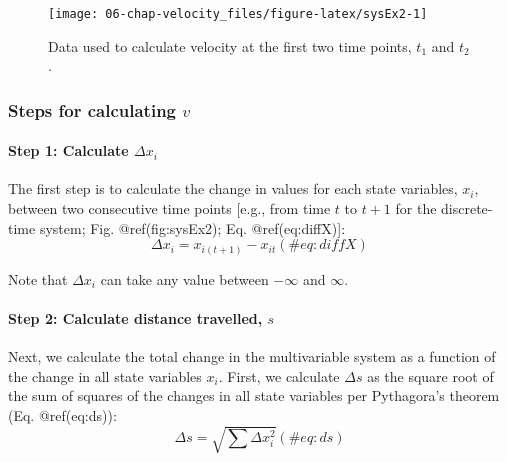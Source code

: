 \documentclass[]{article}
\let\oldparagraph\paragraph
\renewcommand{\paragraph}[1]{\oldparagraph{#1}\mbox{}}
\begin{document}
\begin{figure}

{\centering \texttt{[image: 06-chap-velocity\_files/figure-latex/sysEx2-1]} 

}

\caption{Data used to calculate velocity at the first two time points, $t_1$ and $t_2$.}\label{fig:sysEx2}
\end{figure}

\hypertarget{steps-for-calculating-v}{%
\subsubsection{\texorpdfstring{Steps for calculating
\(v\)}{Steps for calculating v}}\label{steps-for-calculating-v}}

\hypertarget{step-1-calculate-delta-x_i}{%
\paragraph{\texorpdfstring{Step 1: Calculate
\(\Delta x_i\)}{Step 1: Calculate \textbackslash{}Delta x\_i}}\label{step-1-calculate-delta-x_i}}

The first step is to calculate the change in values for each state
variables, \(x_i\), between two consecutive time points {[}e.g., from
time \(t\) to \(t+1\) for the discrete-time system; Fig.
@ref(fig:sysEx2); Eq. @ref(eq:diffX){]}: \begin{equation}
\Delta x_i = x_{i(t+1)} - x_{it} 
(\#eq:diffX)
\end{equation}

Note that \(\Delta x_i\) can take any value between \(-\infty\) and
\(\infty\).

\hypertarget{step-2-calculate-distance-travelled-s}{%
\paragraph{\texorpdfstring{Step 2: Calculate distance travelled,
\(s\)}{Step 2: Calculate distance travelled, s}}\label{step-2-calculate-distance-travelled-s}}

Next, we calculate the total change in the multivariable system as a
function of the change in all state variables \(x_i\). First, we
calculate \(\Delta s\) as the square root of the sum of squares of the
changes in all state variables per Pythagora's theorem (Eq.
@ref(eq:ds)): \begin{equation}
\Delta s = \sqrt{\sum{\Delta x_i^2}}
(\#eq:ds)
\end{equation}
\end{document}
